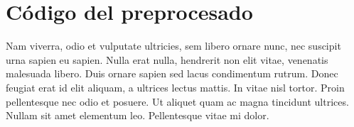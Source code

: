 \chapter{Código del preprocesado}\label{app:preprocesado}

Nam viverra, odio et vulputate ultricies, sem libero ornare nunc, nec suscipit urna sapien eu sapien. Nulla erat nulla, hendrerit non elit vitae, venenatis malesuada libero. Duis ornare sapien sed lacus condimentum rutrum. Donec feugiat erat id elit aliquam, a ultrices lectus mattis. In vitae nisl tortor. Proin pellentesque nec odio et posuere. Ut aliquet quam ac magna tincidunt ultrices. Nullam sit amet elementum leo. Pellentesque vitae mi dolor.


